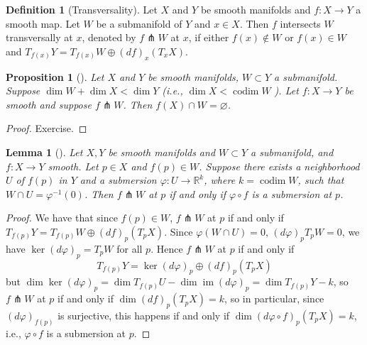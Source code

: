 \documentclass[reqno]{amsart}
\newtheorem{lemma}[theorem]{Lemma}
\newtheorem{proposition}[theorem]{Proposition}
\theoremstyle{definition}
\newtheorem{definition}[theorem]{Definition}
\theoremstyle{remark}
\DeclareMathOperator{\im}{im}
\DeclareMathOperator{\codim}{codim}
\begin{document}
\begin{definition}[Transversality]
    Let $X$ and $Y$ be smooth manifolds and
    $f \colon X \to Y$ a smooth map. Let
    $W$ be a submanifold of $Y$ and
    $x \in X$. Then $f$ intersects $W$ transversally
    at $x$, denoted by
    $f \pitchfork W $ at $x$, if either
    $f(x) \not\in W$ or
    $f(x) \in W$ and
    $T_{f(x)}Y = T_{f(x)} W \oplus
    \left( df \right)_x \left( T_x X \right) $.
\end{definition}

\begin{proposition}[]\label{Transversality-Dimensions}
    Let $X$ and $Y$ be smooth manifolds,
    $W \subset Y$ a submanifold.
    Suppose $\dim W + \dim X < \dim Y$ (i.e.,
    $\dim X < \codim W$ ). Let
    $f \colon X \to Y$ be smooth and suppose
    $f \pitchfork W$. Then
    $f(X) \cap W = \varnothing$.
\end{proposition}

\begin{proof}
    Exercise.
\end{proof}

\begin{lemma}[]\label{Transversality-Submersion}
    Let $X,Y$ be smooth manifolds and
    $W \subset Y$ a submanifold, and
    $f \colon X \to Y$ smooth. Let
    $p \in X$ and $f(p) \in W$. Suppose there
    exists a neighborhood $U$ of $f(p)$ in
    $Y$ and a submersion $\varphi \colon
    U \to \mathbb{R}^{k}$, where
    $k = \codim W$, such that
    $W \cap U = \varphi^{-1}(0)$. Then
    $f \pitchfork W$ at $p$ if and only if
    $\varphi \circ f$ is a submersion at $p$.
\end{lemma}

\begin{proof}
    We have that since
    $f(p) \in W$,
    $f \pitchfork W$ at $p$ if and only if
    $T_{f(p)} Y = T_{f(p)} W \oplus
    (df)_p \left( T_p X \right) $.
    Since
    $\varphi \left( W \cap U \right)
    = 0$,
    $(d \varphi)_p T_pW = 0$, we have
    $\ker \left( d \varphi  \right)_p
    = T_p W$ for all $ p$.
    Hence $f \pitchfork W$ at $p$ if and only if
    \[
        T_{f(p)} Y =
        \ker \left( d \varphi  \right)_p
        \oplus \left( df \right)_p \left( T_pX \right)
    \]
    but
    $\dim \ker \left( d \varphi  \right)_p
    = \dim T_{f(p)} U - \dim
    \im \left( d \varphi  \right)_p
    = \dim T_{f(p)} Y - k$, so
    $f \pitchfork W$ at $p$ if and only if
    $\dim \left( df \right)_p \left( T_p X \right)
    = k$, so in particular,
    since $\left( d \varphi  \right)_{f(p)}$ is surjective,
    this happens if and only if
    $\dim \left( d \varphi \circ f \right)_p
    \left( T_p X \right) = k$, i.e.,
    $\varphi \circ f$ is a submersion at $p$.




\end{proof}
\end{document}
